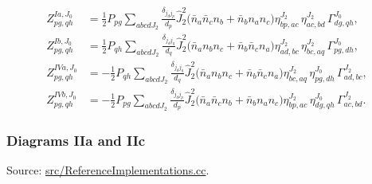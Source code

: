 \documentclass[
]{article}
\begin{document}
\begin{equation}
\begin{aligned}
Z^{Ia,J_0}_{pg,qh}
&=\frac{1}{2}P_{pg}\sum_{abcdJ_2}
\frac{\delta_{j_dj_p}}{d_p}\hat J_2^2
\Big(\bar n_a\bar n_c n_b+\bar n_b n_a n_c\Big)
\eta^{J_2}_{bp,ac}\,
\eta^{J_2}_{ac,bd}\,
\Gamma^{J_0}_{dg,qh},\\
Z^{Ib,J_0}_{pg,qh}
&=\frac{1}{2}P_{qh}\sum_{abcdJ_2}
\frac{\delta_{j_dj_q}}{d_q}\hat J_2^2
\Big(\bar n_a n_b n_c+\bar n_b\bar n_c n_a\Big)
\eta^{J_2}_{ad,bc}\,
\eta^{J_2}_{bc,aq}\,
\Gamma^{J_0}_{pg,dh},\\
Z^{IVa,J_0}_{pg,qh}
&=-\frac{1}{2}P_{qh}\sum_{abcdJ_2}
\frac{\delta_{j_dj_q}}{d_q}\hat J_2^2
\Big(\bar n_a n_b n_c+\bar n_b\bar n_c n_a\Big)
\eta^{J_2}_{bc,aq}\,
\eta^{J_0}_{pg,dh}\,
\Gamma^{J_2}_{ad,bc},\\
Z^{IVb,J_0}_{pg,qh}
&=-\frac{1}{2}P_{pg}\sum_{abcdJ_2}
\frac{\delta_{j_dj_p}}{d_p}\hat J_2^2
\Big(\bar n_a\bar n_c n_b+\bar n_b n_a n_c\Big)
\eta^{J_2}_{bp,ac}\,
\eta^{J_0}_{dg,qh}\,
\Gamma^{J_2}_{ac,bd}.
\end{aligned}
\end{equation}

\subsubsection{Diagrams IIa and IIc}\label{diagrams-iia-and-iic}

Source:
\href{../src/ReferenceImplementations.cc\#L7823-L8135}{src/ReferenceImplementations.cc}.
\end{document}
